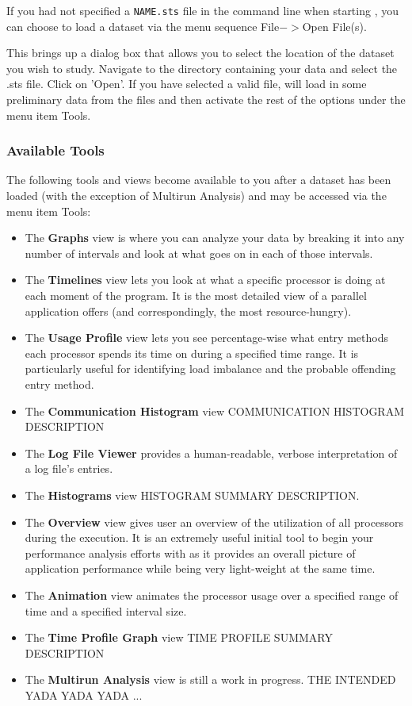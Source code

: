 \documentclass[10pt]{article}
\begin{document}
If you had not specified a {\tt NAME.sts} file in the command line
when starting \projections{}, you can choose to load a dataset via
the menu sequence File$->$Open File(s).

This brings up a dialog box that allows you to select the location of
the dataset you wish to study. Navigate to the directory containing
your data and select the .sts file.  Click on 'Open'.  If you have
selected a valid file, \projections{} will load in some preliminary
data from the files and then activate the rest of the options under
the menu item Tools.

\subsubsection{Available Tools}

The following tools and views become available to you after a dataset
has been loaded (with the exception of Multirun Analysis) and may be
accessed via the menu item Tools:

\begin{itemize}
\item 
The {\bf Graphs} view is where you can analyze your data by breaking it
into any number of intervals and look at what goes on in each of those
intervals.
\item
The {\bf Timelines} view lets you look at what a specific processor is
doing at each moment of the program. It is the most detailed view of a
parallel application \projections{} offers (and correspondingly, the
most resource-hungry).
\item
The {\bf Usage Profile} view lets you see percentage-wise what entry
methods each processor spends its time on during a specified time range.
It is particularly useful for identifying load imbalance and the probable
offending entry method.
\item
The {\bf Communication Histogram} view COMMUNICATION HISTOGRAM DESCRIPTION
\item
The {\bf Log File Viewer} provides a human-readable, verbose
interpretation of a log file's entries.
\item
The {\bf Histograms} view HISTOGRAM SUMMARY DESCRIPTION.
\item
The {\bf Overview} view gives user an overview of the utilization of
all processors during the execution. It is an extremely useful initial
tool to begin your performance analysis efforts with as it provides an
overall picture of application performance while being very
light-weight at the same time.
\item
The {\bf Animation} view animates the processor usage over a specified
range of time and a specified interval size.
\item
The {\bf Time Profile Graph} view TIME PROFILE SUMMARY DESCRIPTION
\item
The {\bf Multirun Analysis} view is still a work in progress. THE INTENDED
YADA YADA YADA ...
\end{itemize}
\end{document}
